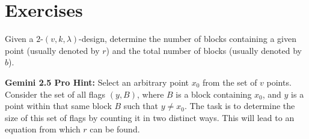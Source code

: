\section{Exercises}

\begin{exr}\label{exr:design-basic-combinatory}
    Given a\/ $2$-$(v,k,\lambda)$-design, determine the number of blocks containing a given point (usually denoted by\/ $r$) and the total number of blocks (usually denoted by\/ $b$).

    \textrm{\small\upshape \textbf{Gemini 2.5 Pro Hint:} Select an arbitrary point $x_0$ from the set of $v$ points. Consider the set of all flags $(y,B)$, where $B$ is a block containing $x_0$, and $y$ is a point within that same block $B$ such that $y \neq x_0$.
    The task is to determine the size of this set of flags by counting it in two distinct ways. This will lead to an equation from which $r$ can be found.}
\end{exr}

